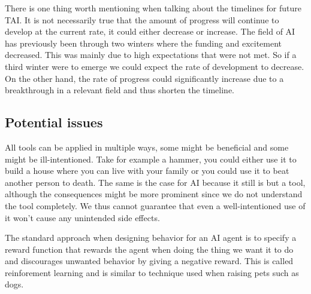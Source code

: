 \documentclass[12pt,A4]{report}
\theoremstyle{definition}
\begin{document}
There is one thing worth mentioning when talking about the timelines for future TAI. It is not necessarily true that the amount of progress will continue to develop at the current rate, it could either decrease or increase. The field of AI has previously been through two winters where the funding and excitement decreased. This was mainly due to high expectations that were not met. So if a third winter were to emerge we could expect the rate of development to decrease. On the other hand, the rate of progress could significantly increase due to a breakthrough in a relevant field and thus shorten the timeline. 



\subsection{Potential issues}
All tools can be applied in multiple ways, some might be beneficial and some might be ill-intentioned. Take for example a hammer, you could either use it to build a house where you can live with your family or you could use it to beat another person to death. The same is the case for AI because it still is but a tool, although the consequences might be more prominent since we do not understand the tool completely. We thus cannot guarantee that even a well-intentioned use of it won't cause any unintended side effects. 

The standard approach when designing behavior for an AI agent is to specify a reward function that rewards the agent when doing the thing we want it to do and discourages unwanted behavior by giving a negative reward. This is called reinforement learning and is similar to technique used when raising pets such as dogs. 
\end{document}
